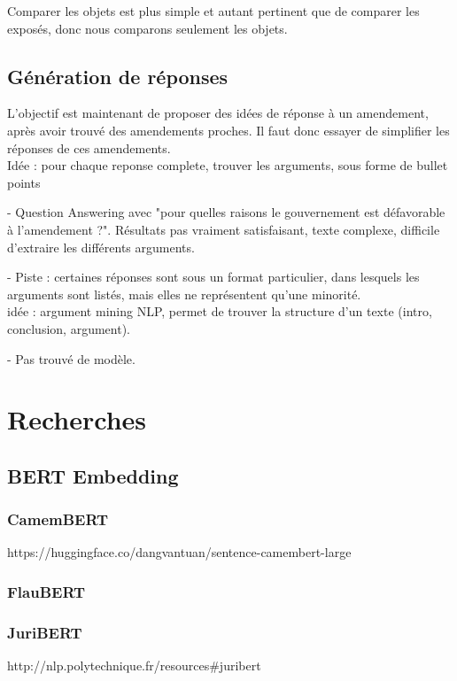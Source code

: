 \documentclass{article}
\begin{document}
Comparer les objets est plus simple et autant pertinent que de comparer les exposés, donc nous comparons seulement les objets.

\subsection{Génération de réponses}

L'objectif est maintenant de proposer des idées de réponse à un amendement, après avoir trouvé des amendements proches. Il faut donc essayer de simplifier les réponses de ces amendements.
\\

Idée : pour chaque reponse complete, trouver les arguments, sous forme de bullet points

- Question Answering avec "pour quelles raisons le gouvernement est défavorable à l'amendement ?". Résultats pas vraiment satisfaisant, texte complexe, difficile d'extraire les différents arguments.

- Piste : certaines réponses sont sous un format particulier, dans lesquels les arguments sont listés, mais elles ne représentent qu'une minorité.
\\

idée : argument mining NLP, permet de trouver la structure d'un texte (intro, conclusion, argument). 

- Pas trouvé de modèle.
\\



\section{Recherches}

\subsection{BERT Embedding}
\subsubsection{CamemBERT}
https://huggingface.co/dangvantuan/sentence-camembert-large
\subsubsection{FlauBERT}
\subsubsection{JuriBERT}
http://nlp.polytechnique.fr/resources#juribert
\end{document}
